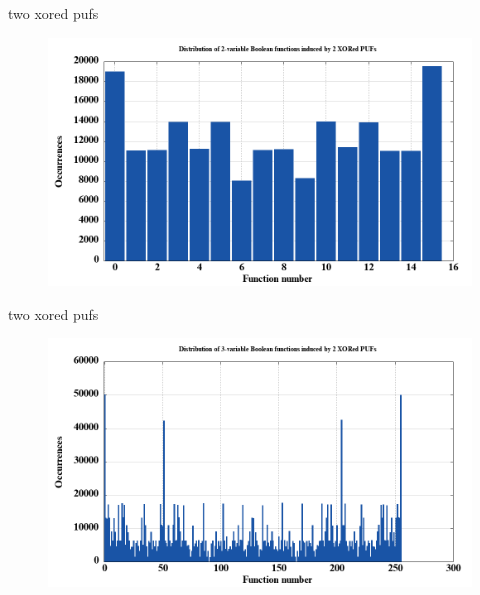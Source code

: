 \documentclass[10pt, compress]{beamer}
\begin{document}
\begin{frame}{two xored pufs}
    \begin{figure}
        \centering
        \includegraphics[width=\textwidth]{figures/dist/distribution_of_2-variable_boolean_functions_induced_by_2_xored_pufs.png}
    \end{figure}
\end{frame}

\begin{frame}{two xored pufs}
    \begin{figure}
        \centering
        \includegraphics[width=\textwidth]{figures/dist/distribution_of_3-variable_boolean_functions_induced_by_2_xored_pufs.png}
    \end{figure}
\end{frame}
\end{document}
